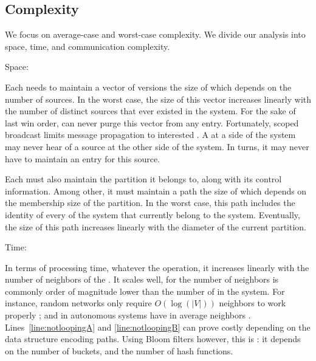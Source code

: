 



\vfill


\newpage

\subsection{Complexity}

We focus on average-case and worst-case complexity. We divide our
analysis into space, time, and communication complexity.

\begin{asparadesc}
\item [Space:]

Each \process needs to maintain a vector of versions the size of which
depends on the number of sources. In the worst case, the size of this
vector increases linearly with the number of distinct sources that
ever existed in the system. For the sake of last win order, \processes
can never purge this vector from any entry.  Fortunately, scoped broadcast limits
message propagation to interested \processes. A \process at a side of
the system may never hear of a source at the other side of the
system. In turns, it may never have to maintain an entry for this
source. 

\noindent Each \process must also maintain the partition it belongs to,
along with its control information. Among other, it must maintain a
path the size of which depends on the membership size of the
partition. In the worst case, this path includes the identity of every
\process of the system that currently belong to the system. Eventually,
the size of this path increases linearly with the diameter of the
current partition. 

\item[Time:]
  
In terms of processing time, whatever the operation, it increases
linearly with the number of neighbors of the \process. It scales well,
for the number of neighbors is commonly order of magnitude lower than
the number of \processes in the system. For instance, random networks
only require $O(\log(|V|))$ neighbors to work properly \REF; and
\processes in autonomous systems have in average  neighbors
\REF. Lines~\ref{line:notloopingA} and \ref{line:notloopingB} can
prove costly depending on the data structure encoding paths. Using
Bloom filters however, this is : it depends on the
number of buckets, and the number of hash functions.


\end{asparadesc}
